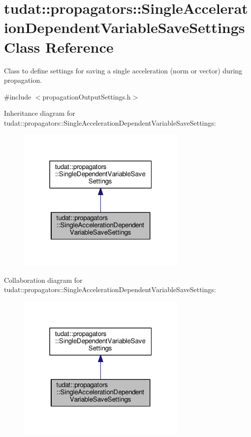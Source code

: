 \hypertarget{classtudat_1_1propagators_1_1SingleAccelerationDependentVariableSaveSettings}{}\section{tudat\+:\+:propagators\+:\+:Single\+Acceleration\+Dependent\+Variable\+Save\+Settings Class Reference}
\label{classtudat_1_1propagators_1_1SingleAccelerationDependentVariableSaveSettings}


Class to define settings for saving a single acceleration (norm or vector) during propagation.  




{\ttfamily \#include $<$propagation\+Output\+Settings.\+h$>$}



Inheritance diagram for tudat\+:\+:propagators\+:\+:Single\+Acceleration\+Dependent\+Variable\+Save\+Settings\+:
\nopagebreak
\begin{figure}[H]
\begin{center}
\leavevmode
\includegraphics[width=235pt]{classtudat_1_1propagators_1_1SingleAccelerationDependentVariableSaveSettings__inherit__graph}
\end{center}
\end{figure}


Collaboration diagram for tudat\+:\+:propagators\+:\+:Single\+Acceleration\+Dependent\+Variable\+Save\+Settings\+:
\nopagebreak
\begin{figure}[H]
\begin{center}
\leavevmode
\includegraphics[width=235pt]{classtudat_1_1propagators_1_1SingleAccelerationDependentVariableSaveSettings__coll__graph}
\end{center}
\end{figure}
